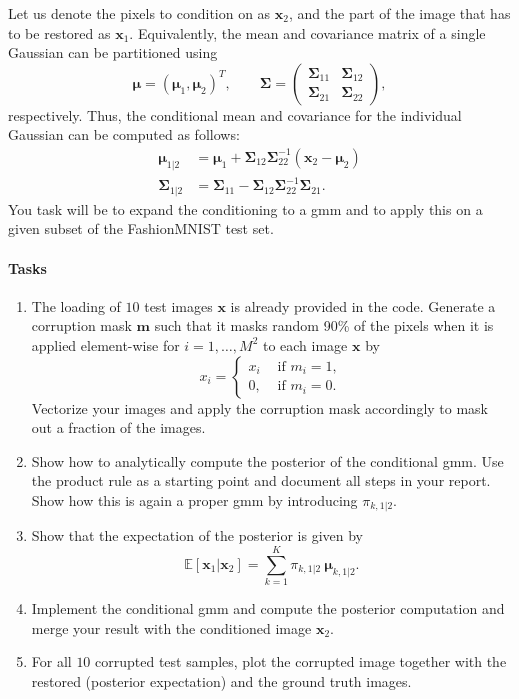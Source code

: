 \documentclass{article}
\newcommand{\sig}{\boldsymbol{\Sigma}}
\newcommand{\m}{\boldsymbol{\mu}}
\renewcommand{\vec}[1]{\textbf{#1}}
\renewcommand{\vec}[1]{\textbf{#1}}
\begin{document}
Let us denote the pixels to condition on as $\vec x_2$, and the part of the image that has to be restored as $\vec x_1$. Equivalently, the mean and covariance matrix of a single Gaussian can be partitioned using 
\begin{equation*}
\m = (\m_{1},\m_2)^T, \qquad 
\sig=\begin{pmatrix}
\sig_{11} & \sig_{12} \\ \sig_{21} & \sig_{22} 
\end{pmatrix},
\end{equation*}
respectively. Thus, the conditional mean and covariance for the individual Gaussian can be computed as follows:
\begin{align*}
\m_{1|2} &= \m_1 + \sig_{12}  \sig_{22}^{-1} (\vec x_2 - \m_2) \\
\sig_{1|2} & = \sig_{11} - \sig_{12} \sig_{22}^{-1} \sig_{21}.
\end{align*}
You task will be to expand the conditioning to a \gls{gmm} and to apply this on a given subset of the FashionMNIST test set. 

\paragraph{Tasks}
\begin{enumerate}
\item The loading of $10$ test images $\vec x$ is already provided in the code. Generate a corruption mask $\vec m$ such that it masks random 90\% of the pixels when it is applied element-wise for $i=1,\dots,M^2$ to each image $\vec x$ by
\begin{equation*}
x_i = \begin{cases} x_i &\text{ if }  m_i = 1, \\
0, &\text{ if } m_i = 0.
\end{cases}
\end{equation*}
Vectorize your images and apply the corruption mask accordingly to mask out a fraction of the images.
\item Show how to analytically compute the posterior of the conditional \gls{gmm}.  
Use the product rule as a starting point and document all steps in your report. Show how this is again a proper \gls{gmm} by introducing $\pi_{k,1|2}$. 
\item Show that the expectation of the posterior is given by
\[
\mathbb{E}[\vec x_1|\vec x_2] = \sum_{k=1}^K \pi_{k,1|2}~ \m_{k,1|2}.
\] 
\item Implement the conditional \gls{gmm} and compute the posterior computation and merge your result with the conditioned image $\vec x_2$. 
\item For all $10$ corrupted test samples, plot the corrupted image together with the restored (posterior expectation) and the ground truth images. 
\end{enumerate}
\end{document}
